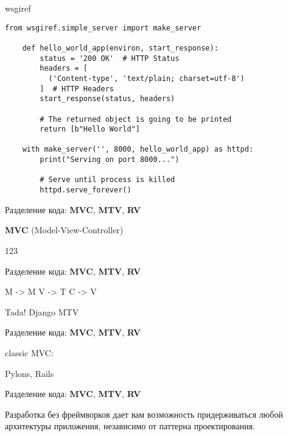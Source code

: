 \begin{frame}[fragile]{wsgiref}

    \begin{lstlisting}[style=python]
    from wsgiref.simple_server import make_server

    def hello_world_app(environ, start_response):
        status = '200 OK'  # HTTP Status
        headers = [
          ('Content-type', 'text/plain; charset=utf-8')
        ]  # HTTP Headers
        start_response(status, headers)

        # The returned object is going to be printed
        return [b"Hello World"]

    with make_server('', 8000, hello_world_app) as httpd:
        print("Serving on port 8000...")

        # Serve until process is killed
        httpd.serve_forever()
    \end{lstlisting}

\end{frame}

\begin{frame}{Разделение кода: \textbf{MVC}, \textbf{MTV}, \textbf{RV}}

  \textbf{MVC} (Model-View-Controller)

  123

\end{frame}


\begin{frame}{Разделение кода: \textbf{MVC}, \textbf{MTV}, \textbf{RV}}

  M -> M
  V -> T
  C -> V

  Tada! Django MTV

\end{frame}

\begin{frame}{Разделение кода: \textbf{MVC}, \textbf{MTV}, \textbf{RV}}

  classic MVC:

  Pylons, Rails

\end{frame}

\begin{frame}{Разделение кода: \textbf{MVC}, \textbf{MTV}, \textbf{RV}}

  Разработка без фреймворков дает вам возможность придерживаться любой
  архитектуры приложения, независимо от паттерна проектирования.

\end{frame}

